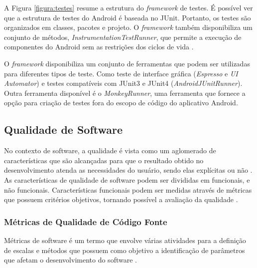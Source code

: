 A Figura \ref{figura:testes} resume a estrutura do \textit{framework} de testes. É possível ver que a estrutura de testes do Android é baseada no JUnit. Portanto, os testes são organizados em classes, pacotes e projeto. O \textit{framework} também disponibiliza um conjunto de métodos, \textit{InstrumentationTestRunner}, que permite a execução de componentes do Android sem as restrições dos ciclos de vida \cite{androidTesting2015}.

O \textit{framework} disponibiliza um conjunto de ferramentas que podem ser utilizadas para diferentes tipos de teste. Como teste de interface gráfica (\textit{Espresso} e \textit{UI Automator}) e testes compatíveis com JUnit3 e JUnit4 (\textit{AndroidJUnitRunner}). Outra ferramenta disponível é o \textit{MonkeyRunner}, uma ferramenta que fornece a opção para criação de testes fora do escopo de código do aplicativo Android.




  \subsection{Qualidade de Software}

No contexto de software, a qualidade é vista como um aglomerado de características
que são alcançadas para que o resultado obtido no desenvolvimento
atenda as necessidades do usuário, sendo elas explícitas ou não \cite{rocha2001}.
As características de qualidade de software podem ser divididas em funcionais,
e não funcionais. Características funcionais podem ser medidas através de métricas
que possuem critérios objetivos, tornando possível a avaliação da qualidade \cite{meirelles2013}.

    \subsubsection{Métricas de Qualidade de Código Fonte}

Métricas de software é um termo que envolve várias atividades para a definição de
escalas e métodos que possuem como objetivo a identificação de parâmetros que afetam o
desenvolvimento do software \cite{metrics}.

